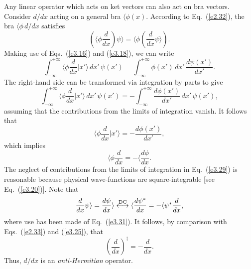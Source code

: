 Any linear operator which acts on ket vectors can also act on bra vectors. 
Consider $d/dx$ acting on a general bra $\langle \phi(x)$. According to
Eq.~(\ref{e2.32}), the bra $\langle \phi \,d/dx$ satisfies
\begin{equation}
\left( \langle \phi \frac{d}{dx} \right) \psi\rangle = \langle \phi\left(
\frac{d}{dx}\psi\rangle\right).
\end{equation}
Making use of Eqs.~(\ref{e3.16}) and (\ref{e3.18}), we can write
\begin{equation}
\int_{-\infty}^{+\infty} \langle \phi \frac{d}{dx} |x'\rangle
\,dx'\, \psi(x') = \int_{-\infty}^{+\infty} \phi(x')\, dx'\, \frac{d\psi(x')}{dx'}.
\end{equation}
The right-hand side can be transformed via integration by parts to give
\begin{equation}\label{e3.29}
\int_{-\infty}^{+\infty} \langle \phi \frac{d}{dx} |x'\rangle
\,dx' \,\psi(x') = -\int_{-\infty}^{+\infty} \frac{d \phi(x')}{dx'}\,  dx' \,\psi(x'),
\end{equation}
assuming that the contributions from the limits of integration vanish. 
It follows that
\begin{equation}
\langle \phi \frac{d}{dx} | x'\rangle = - \frac{d \phi(x')}{dx'},
\end{equation}
which implies 
\begin{equation}\label{e3.31}
\langle \phi \frac{d}{dx} = - \langle \frac{d\phi}{dx}.
\end{equation}
The neglect of contributions from the limits of integration in Eq.~(\ref{e3.29}) is
reasonable because
 physical wave-functions are square-integrable [see Eq.~(\ref{e3.20})].
Note that
\begin{equation}
\frac{d}{dx} \psi\rangle = \frac{d\psi}{dx}\rangle \stackrel{\rm DC}{\longleftrightarrow}
\langle \frac{d\psi^\ast}{dx} = -\langle \psi^\ast \frac{d}{dx},
\end{equation}
where use has been made of Eq.~(\ref{e3.31}). 
It follows, by comparison with Eqs.~(\ref{e2.33}) and (\ref{e3.25}), that
\begin{equation}\label{e3.33}
\left(\frac{d}{dx}\right)^{\dag }= - \frac{d}{dx}.
\end{equation}
Thus, $d/dx$ is an {\em anti-Hermitian}  operator. 


